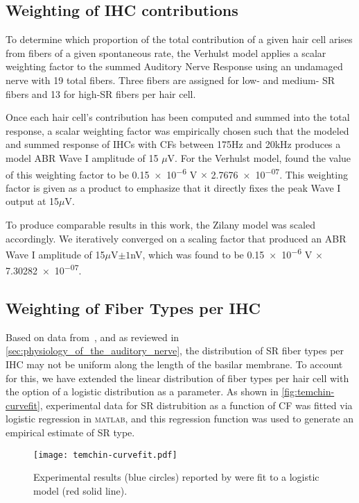 \subsection{Weighting of IHC contributions} %
\label{sub:weighting_of_ihc_contribution}
To determine which proportion of the total contribution of a given hair cell arises from fibers of a given spontaneous rate, the Verhulst model applies a scalar weighting factor to the summed Auditory Nerve Response using an undamaged nerve with 19 total fibers. Three fibers are assigned for low- and medium- SR fibers and 13 for high-SR fibers per hair cell. 

Once each hair cell's contribution has been computed and summed into the total response,  a scalar weighting factor was empirically chosen such that the modeled and summed response of IHCs with CFs between 175Hz and 20kHz produces a model ABR Wave I amplitude of 15 $\mu$V.  For the Verhulst model, \citeauthor{Verhulst2015Functional} found the value of this weighting factor to be \num{0.15e-6} V $\times$ \num{2.7676e-07}.  This weighting factor is given as a product to emphasize that it directly fixes the peak Wave I output at 15$\mu$V. 

To produce comparable results in this work, the Zilany model was scaled accordingly. We iteratively converged on a scaling factor that produced an ABR Wave I amplitude of 15$\mu$V$\pm 1$nV, which was found to be \num{0.15e-6} V $\times$ \num{7.30282e-07}.

\subsection{Weighting of Fiber Types per IHC} %
\label{sub:weighting_of_fiber_types_per_ihc}
Based on data from~\cite{Temchin2008Threshold}, and as reviewed in \autoref{sec:physiology_of_the_auditory_nerve}, the distribution of SR fiber types per IHC may not be uniform along the length of the basilar membrane.  To account for this, we have extended the linear distribution of fiber types per hair cell with the option of a logistic distribution as a parameter.   As shown in \autoref{fig:temchin-curvefit}, experimental data for SR distrubition as a function of CF was fitted via logistic regression in \textsc{matlab}, and this regression function was used to generate an empirical estimate of SR type. 

\begin{figure}[htbp]
	\centering
	\texttt{[image: temchin-curvefit.pdf]}
	\caption[Variation in Spontaneous Rate as a Function of Frequency]{Experimental results (blue circles) reported by \citeauthor{Temchin2008Threshold} were fit to a logistic model (red solid line).}
	\label{fig:temchin-curvefit}
\end{figure}

